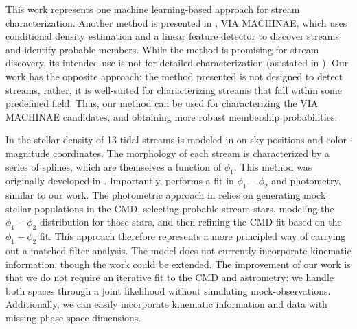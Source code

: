 \documentclass[twocolumn]{aastex631}
\begin{document}
        This work represents one machine learning-based approach for stream
        characterization. Another method is presented in \citet{Shih+2022}, VIA
        MACHINAE, which uses conditional density estimation and a linear feature
        detector to discover streams and identify probable members. While the
        method is promising for stream discovery, its intended use is not for
        detailed characterization (as stated in \citealt{Shih+2022}). Our work
        has the opposite approach: the method presented is not designed to
        detect streams, rather, it is well-suited for characterizing streams
        that fall within some predefined field. Thus, our method can be used for
        characterizing the VIA MACHINAE candidates, and obtaining more robust
        membership probabilities. 

        In \citet{Patrick+2022} the stellar density of 13 tidal streams is
        modeled in on-sky positions and color-magnitude coordinates. The
        morphology of each stream is characterized by a series of splines, which
        are themselves a function of $\phi_1$. This method was originally
        developed in \citet{Erkal+2017}.  Importantly, \citet{Patrick+2022}
        performs a fit in $\phi_1-\phi_2$ and photometry, similar to our work.
        The photometric approach in \citet{Patrick+2022} relies on generating
        mock stellar populations in the CMD, selecting probable stream stars,
        modeling the $\phi_1-\phi_2$ distribution for those stars, and then
        refining the CMD fit based on the $\phi_1-\phi_2$ fit. This approach
        therefore represents a more principled way of carrying out a matched
        filter analysis. The model does not currently incorporate kinematic
        information, though the work could be extended. The improvement of our
        work is that we do not require an iterative fit to the CMD and
        astrometry: we handle both spaces through a joint likelihood without
        simulating mock-observations. Additionally, we can easily incorporate
        kinematic information and data with missing phase-space dimensions. 
        
\end{document}

